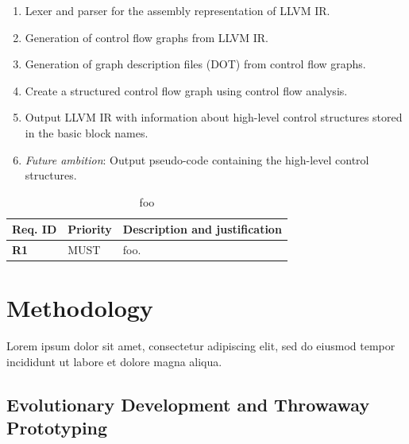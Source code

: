 \documentclass[12pt, a4paper]{article}
\begin{document}

\begin{enumerate}
	\item Lexer and parser for the assembly representation of LLVM IR.
	\item Generation of control flow graphs from LLVM IR.
	\item Generation of graph description files (DOT) from control flow graphs.
	\item Create a structured control flow graph using control flow analysis.
	\item Output LLVM IR with information about high-level control structures stored in the basic block names.
	\item \textit{Future ambition}: Output pseudo-code containing the high-level control structures.
\end{enumerate}

\begin{table}[htbp]
	\begin{center}
		\begin{tabular}{|l|l|l|}
			\hline
			Req. ID & Priority & Description and justification \\
			\hline
			\textbf{R1} & MUST & foo. \\
			\hline
		\end{tabular}
	\end{center}
	\caption{foo}
\end{table}



\section{Methodology}

Lorem ipsum dolor sit amet, consectetur adipiscing elit, sed do eiusmod tempor incididunt ut labore et dolore magna aliqua.



\subsection{Evolutionary Development and Throwaway Prototyping}
\end{document}

